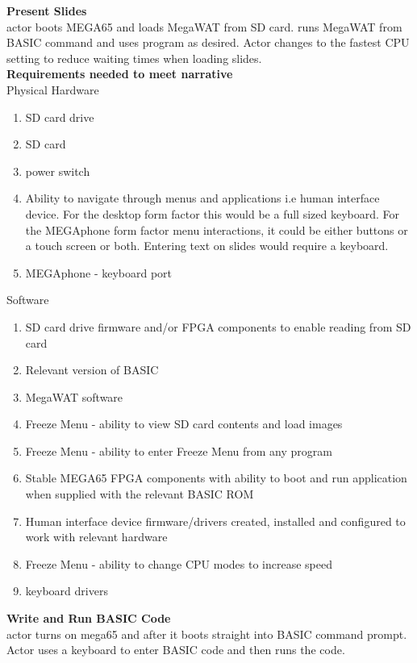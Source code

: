 \textbf{Present Slides}\\
actor boots MEGA65 and loads MegaWAT from SD card. runs MegaWAT from BASIC command and uses program as desired. Actor changes to the fastest CPU setting to reduce waiting times when loading slides.\\

\textbf{Requirements needed to meet narrative}\\
Physical Hardware
\begin{enumerate}
\item SD card drive
\item SD card
\item power switch
\item Ability to navigate through menus and applications i.e human interface device. For the desktop form factor this would be a full sized keyboard. For the MEGAphone form factor menu interactions, it could be either buttons or a touch screen or both. Entering text on slides would require a keyboard.
\item MEGAphone - keyboard port
\end{enumerate}

Software\\
\begin{enumerate}
\item SD card drive firmware and/or FPGA components to enable reading from SD card
\item Relevant version of BASIC 
\item MegaWAT software
\item Freeze Menu - ability to view SD card contents and load images
\item Freeze Menu - ability to enter Freeze Menu from any program
\item Stable MEGA65 FPGA components with ability to boot and run application when supplied with the relevant BASIC ROM
\item Human interface device firmware/drivers created, installed and configured to work with relevant hardware
\item Freeze Menu - ability to change CPU modes to increase speed
\item keyboard drivers
\end{enumerate}

\textbf{Write and Run BASIC Code}\\
actor turns on mega65 and after it boots straight into BASIC command prompt. Actor uses a keyboard to enter BASIC code and then runs the code.\\

